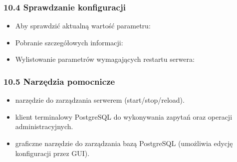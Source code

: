 \documentclass[letterpaper,10pt,polish]{sphinxmanual}
\begin{document}
\subsubsection{10.4 Sprawdzanie konfiguracji}
\label{\detokenize{rozdzial2/Konfiguracja_baz_danych/Konfiguracja_baz_danych:sprawdzanie-konfiguracji}}\begin{itemize}
\item {} 
\sphinxAtStartPar
Aby sprawdzić aktualną wartość parametru:

\begin{sphinxVerbatim}[commandchars=\\\{\}]
 
\end{sphinxVerbatim}

\item {} 
\sphinxAtStartPar
Pobranie szczegółowych informacji:

\begin{sphinxVerbatim}[commandchars=\\\{\}]
     
 
   
\end{sphinxVerbatim}

\item {} 
\sphinxAtStartPar
Wylistowanie parametrów wymagających restartu serwera:

\begin{sphinxVerbatim}[commandchars=\\\{\}]
       
\end{sphinxVerbatim}

\end{itemize}


\subsubsection{10.5 Narzędzia pomocnicze}
\label{\detokenize{rozdzial2/Konfiguracja_baz_danych/Konfiguracja_baz_danych:narzedzia-pomocnicze}}\begin{itemize}
\item {} 
\sphinxAtStartPar
{} \textendash{} narzędzie do zarządzania serwerem (start/stop/reload).

\item {} 
\sphinxAtStartPar
{} \textendash{} klient terminalowy PostgreSQL do wykonywania zapytań oraz operacji administracyjnych.

\item {} 
\sphinxAtStartPar
{} \textendash{} graficzne narzędzie do zarządzania bazą PostgreSQL (umożliwia edycję konfiguracji przez GUI).

\end{itemize}
\end{document}
